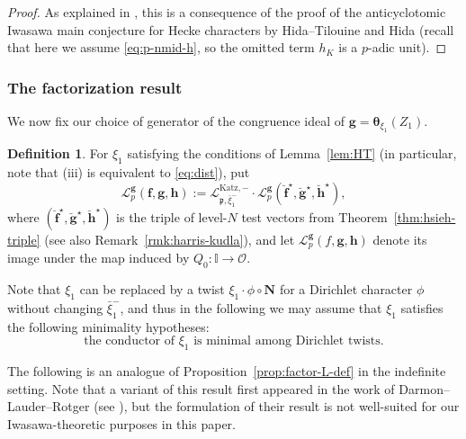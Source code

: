 \documentclass[10pt,letterpaper]{amsart}
\theoremstyle{plain}
\theoremstyle{definition}
\newtheorem{defn}[thm]{Definition}
\theoremstyle{definition}
\theoremstyle{plain}
\theoremstyle{plain}
\theoremstyle{plain}
\theoremstyle{remark}
\numberwithin{equation}{section}
\newcommand{\ch}{\xi}
\newcommand{\pp}{\mathfrak{p}}
\def\cO{\mathcal O}
\newcommand{\cR}{\mathbb{I}}
\newcommand{\bff}{{\boldsymbol{f}}}
\newcommand{\bfg}{{\boldsymbol{g}}}
\newcommand{\bfh}{{\boldsymbol{h}}}
\begin{document}
\begin{proof}
As explained in \cite[Prop.~4.6]{ACR2}, this is a consequence of the proof of the anticyclotomic Iwasawa main conjecture for Hecke characters by Hida--Tilouine \cite{HT-ENS,HT-117} and Hida \cite{hida-coates} (recall that here we assume \eqref{eq:p-nmid-h}, so the omitted term $h_K$ is a $p$-adic unit). 
\end{proof}

\subsubsection{The factorization result}

We now fix our choice of generator of the congruence ideal of $\bfg=\boldsymbol{\theta}_{\xi_1}(Z_1)$.

\begin{defn}\label{def:gen-triple}
For $\xi_1$ satisfying the conditions of Lemma~\ref{lem:HT} (in particular, note that (iii) is equivalent to \eqref{eq:dist}), put
\[
\mathscr{L}_p^{\bfg}(\bff,\bfg,\bfh):=\mathcal{L}_{\pp,\bar{\xi}_1^-}^{{\mathrm{Katz}},-}\cdot\mathscr{L}_p^{\bfg}(\breve{\bff}^\star,\breve{\bfg}^\star,\breve{\bfh}^\star),
\]
where $(\breve{\bff}^\star,\breve{\bfg}^\star,\breve{\bfh}^\star)$ is the triple of level-$N$ test vectors from Theorem~\ref{thm:hsieh-triple} (see also Remark~\ref{rmk:harris-kudla}), and let $\mathscr{L}_p^{\bfg}(f,\bfg,\bfh)$ denote its image under the map induced by $Q_0:\cR\rightarrow\cO$.
\end{defn}

Note that $\ch_1$ can be replaced by a twist $\ch_1\cdot\phi\circ\mathbf{N}$ for a Dirichlet character $\phi$ without changing $\bar\ch_1^-$, and thus in the following we may assume that $\ch_1$ satisfies the following minimality hypotheses:
\begin{equation}\label{eq:minimal}
\textrm{the conductor of $\ch_1$ is minimal among Dirichlet twists.} %
\end{equation}

The following is an analogue of Proposition~\ref{prop:factor-L-def} in the indefinite setting. Note that a variant of this result first appeared in the work of Darmon--Lauder--Rotger (see \cite[Thm.~3.9]{DLR-stark}), but the formulation of their result is not well-suited for our Iwasawa-theoretic purposes in this paper. %
\end{document}
